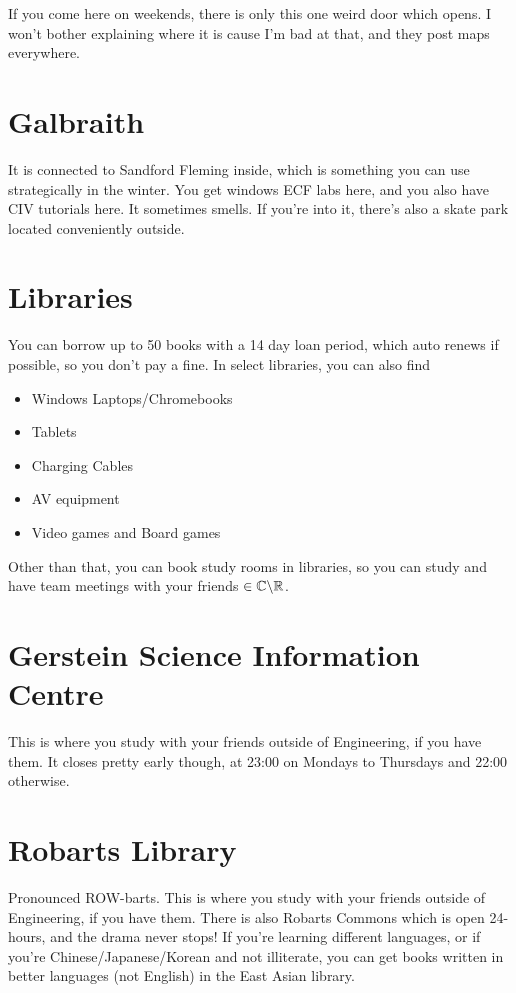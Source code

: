 If you come here on weekends, there is only this one weird door which opens. I won't bother explaining where it is cause I'm bad at that, and they post maps everywhere.

\section{Galbraith}

It is connected to Sandford Fleming inside, which is something you can use strategically in the winter. You get windows ECF labs here, and you also have CIV tutorials here. It sometimes smells. If you're into it, there's also a skate park located conveniently outside.

\section{Libraries}

You can borrow up to 50 books with a 14 day loan period, which auto renews if possible, so you don't pay a fine. In select libraries, you can also find

\begin{itemize}
    \item Windows Laptops/Chromebooks
    \item Tablets
    \item Charging Cables
    \item AV equipment
    \item Video games and Board games
\end{itemize}

Other than that, you can book study rooms in libraries, so you can study and have team meetings with your friends $\in \mathbb{C}\backslash\mathbb{R}$.

\section{Gerstein Science Information Centre}

This is where you study with your friends outside of Engineering, if you have them. It closes pretty early though, at 23:00 on Mondays to Thursdays and 22:00 otherwise.

\section{Robarts Library}

Pronounced ROW-barts. This is where you study with your friends outside of Engineering, if you have them. There is also Robarts Commons which is open 24-hours, and the drama never stops! If you're learning different languages, or if you're Chinese/Japanese/Korean and not illiterate, you can get books written in better languages (not English) in the East Asian library.
